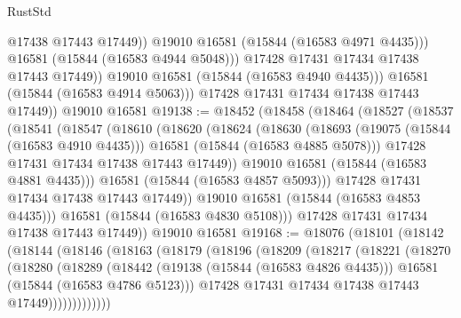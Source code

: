 \begin{lexlean}{RustStd}
\begin{coremodule}
                        @17438
                        @17443
                        @17449))
                    @19010
                    @16581
                    (@15844 (@16583 @4971 @4435)))
                  @16581
                  (@15844 (@16583 @4944 @5048)))
                @17428
                @17431
                @17434
                @17438
                @17443
                @17449))
            @19010
            @16581
            (@15844 (@16583 @4940 @4435)))
          @16581
          (@15844 (@16583 @4914 @5063)))
        @17428
        @17431
        @17434
        @17438
        @17443
        @17449))
    @19010
    @16581
@19138 := @18452
    (@18458
      (@18464
        (@18527
          (@18537
            (@18541
              (@18547
                (@18610
                  (@18620
                    (@18624
                      (@18630
                        (@18693
                          (@19075 (@15844 (@16583 @4910 @4435)))
                          @16581
                          (@15844 (@16583 @4885 @5078)))
                        @17428
                        @17431
                        @17434
                        @17438
                        @17443
                        @17449))
                    @19010
                    @16581
                    (@15844 (@16583 @4881 @4435)))
                  @16581
                  (@15844 (@16583 @4857 @5093)))
                @17428
                @17431
                @17434
                @17438
                @17443
                @17449))
            @19010
            @16581
            (@15844 (@16583 @4853 @4435)))
          @16581
          (@15844 (@16583 @4830 @5108)))
        @17428
        @17431
        @17434
        @17438
        @17443
        @17449))
    @19010
    @16581
@19168 := @18076
    (@18101
      (@18142
        (@18144
          (@18146
            (@18163
              (@18179
                (@18196
                  (@18209
                    (@18217
                      (@18221
                        (@18270
                          (@18280
                            (@18289
                              (@18442
                                (@19138 (@15844 (@16583 @4826 @4435)))
                                @16581
                                (@15844 (@16583 @4786 @5123)))
                              @17428
                              @17431
                              @17434
                              @17438
                              @17443
                              @17449)))))))))))))

\end{coremodule}
\end{lexlean}
